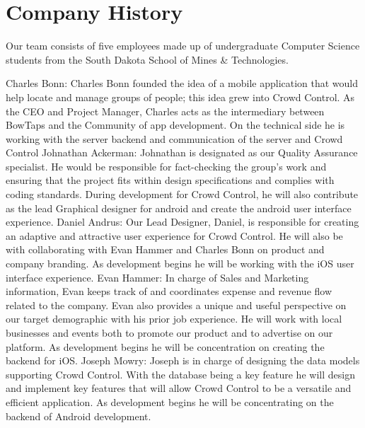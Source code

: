 \section{Company History}

Our team consists of five employees made up of undergraduate Computer Science students from the South Dakota School of Mines \& Technologies. 

Charles Bonn: Charles Bonn founded the idea of a mobile application that would help locate and manage groups of people; this idea grew into Crowd Control. As the CEO and Project Manager, Charles acts as the intermediary between BowTaps and the Community of app development. On the technical side he is working with the server backend and communication of the server and Crowd Control 
Johnathan Ackerman: Johnathan is designated as our Quality Assurance specialist. He would be responsible for fact-checking the group’s work and ensuring that the project fits within design specifications and complies with coding standards. During development for Crowd Control, he will also contribute as the lead Graphical designer for android and create the android user interface experience.
Daniel Andrus: 
Our Lead Designer, Daniel, is responsible for creating an adaptive and attractive user experience for Crowd Control. He will also be with collaborating with Evan Hammer and Charles Bonn on product and company branding. As development begins he will be working with the iOS user interface experience.
Evan Hammer: In charge of Sales and Marketing information, Evan keeps track of and coordinates expense and revenue flow related to the company. Evan also provides a unique and useful perspective on our target demographic with his prior job experience. He will work with local businesses and events both to promote our product and to advertise on our platform. As development begins he will be concentration on creating the backend for iOS. 
Joseph Mowry: Joseph is in charge of designing the data models supporting Crowd Control. With the database being a key feature he will design and implement key features that will allow Crowd Control to be a versatile and efficient application. As development begins he will be concentrating on the backend of Android development.






